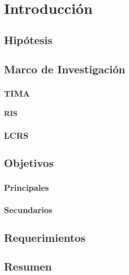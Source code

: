 \chapter{Introducción}\label{marco del trabajo}
    
    
    \section{Hipótesis}
    

    \section{Marco de Investigación}
        \subsection{TIMA}
            \subsubsection{RIS}
        \subsection{LCRS}

\section{Objetivos}
    \subsection{Principales}
    \subsection{Secundarios}

\section{Requerimientos}

\section{Resumen}